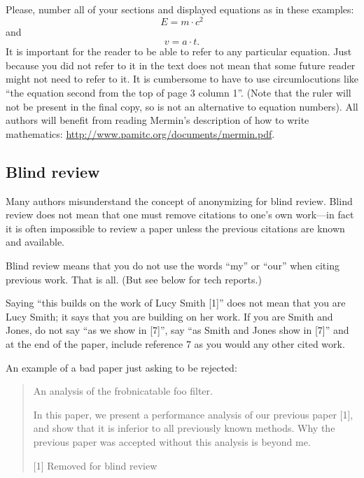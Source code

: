 Please, number all of your sections and displayed equations as in these examples:
\begin{equation}
  E = m\cdot c^2
  \label{eq:important}
\end{equation}
and
\begin{equation}
  v = a\cdot t.
  \label{eq:also-important}
\end{equation}
It is important for the reader to be able to refer to any particular equation.
Just because you did not refer to it in the text does not mean that some future reader might not need to refer to it.
It is cumbersome to have to use circumlocutions like ``the equation second from the top of page 3 column 1''.
(Note that the ruler will not be present in the final copy, so is not an alternative to equation numbers).
All authors will benefit from reading Mermin's description of how to write mathematics:
\url{http://www.pamitc.org/documents/mermin.pdf}.

\subsection{Blind review}

Many authors misunderstand the concept of anonymizing for blind review.
Blind review does not mean that one must remove citations to one's own work---in fact it is often impossible to review a paper unless the previous citations are known and available.

Blind review means that you do not use the words ``my'' or ``our'' when citing previous work.
That is all.
(But see below for tech reports.)

Saying ``this builds on the work of Lucy Smith [1]'' does not mean that you are Lucy Smith;
it says that you are building on her work.
If you are Smith and Jones, do not say ``as we show in [7]'', say ``as Smith and Jones show in [7]'' and at the end of the paper, include reference 7 as you would any other cited work.

An example of a bad paper just asking to be rejected:
\begin{quote}
\begin{center}
    An analysis of the frobnicatable foo filter.
\end{center}

   In this paper, we present a performance analysis of our previous paper [1], and show that it is inferior to all previously known methods.
   Why the previous paper was accepted without this analysis is beyond me.

   [1] Removed for blind review
\end{quote}


